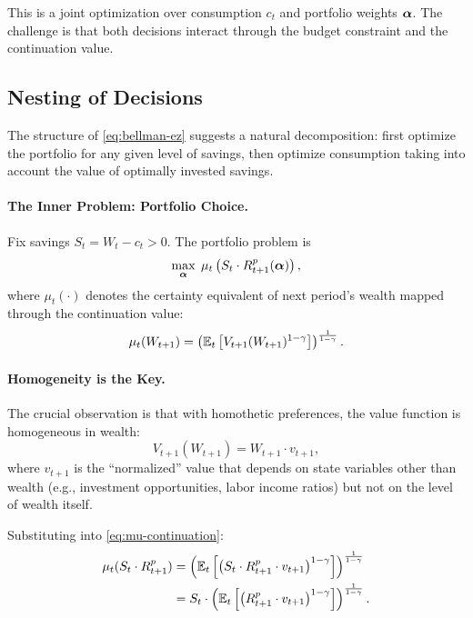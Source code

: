 This is a joint optimization over consumption $c_t$ and portfolio weights $\boldsymbol{\alpha}$. The challenge is that both decisions interact through the budget constraint and the continuation value.

\subsection{Nesting of Decisions}
\label{subsec:nesting}

The structure of \eqref{eq:bellman-ez} suggests a natural decomposition: first optimize the portfolio for any given level of savings, then optimize consumption taking into account the value of optimally invested savings.

\paragraph{The Inner Problem: Portfolio Choice.}

Fix savings $S_t = W_t - c_t > 0$. The portfolio problem is
\begin{equation}
\max_{\boldsymbol{\alpha}} \; \mu_t\left( S_t \cdot R_{t+1}^p(\boldsymbol{\alpha}) \right),
\label{eq:inner-problem}
\end{equation}
where $\mu_t(\cdot)$ denotes the certainty equivalent of next period's wealth mapped through the continuation value:
\begin{equation}
\mu_t(W_{t+1}) = \left( \mathbb{E}_t\left[ V_{t+1}(W_{t+1})^{1-\gamma} \right] \right)^{\frac{1}{1-\gamma}}.
\label{eq:mu-continuation}
\end{equation}

\paragraph{Homogeneity is the Key.}

The crucial observation is that with homothetic preferences, the value function is homogeneous in wealth:
\begin{equation}
V_{t+1}(W_{t+1}) = W_{t+1} \cdot v_{t+1},
\label{eq:value-homogeneity}
\end{equation}
where $v_{t+1}$ is the ``normalized'' value that depends on state variables other than wealth (e.g., investment opportunities, labor income ratios) but not on the level of wealth itself.

Substituting into \eqref{eq:mu-continuation}:
\begin{align}
\mu_t(S_t \cdot R_{t+1}^p) &= \left( \mathbb{E}_t\left[ \left( S_t \cdot R_{t+1}^p \cdot v_{t+1} \right)^{1-\gamma} \right] \right)^{\frac{1}{1-\gamma}} \notag \\
&= S_t \cdot \left( \mathbb{E}_t\left[ \left( R_{t+1}^p \cdot v_{t+1} \right)^{1-\gamma} \right] \right)^{\frac{1}{1-\gamma}}.
\label{eq:mu-factored}
\end{align}

